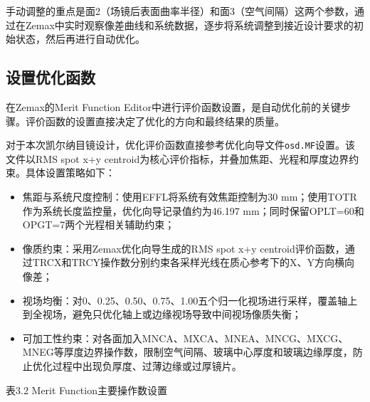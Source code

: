 手动调整的重点是面2（场镜后表面曲率半径）和面3（空气间隔）这两个参数，通过在Zemax中实时观察像差曲线和系统数据，逐步将系统调整到接近设计要求的初始状态，然后再进行自动优化。

\subsection{设置优化函数}

在Zemax的Merit Function Editor中进行评价函数设置，是自动优化前的关键步骤。评价函数的设置直接决定了优化的方向和最终结果的质量\cite{Fischer2008,Laikin2007,Zemax2021}。

对于本次凯尔纳目镜设计，优化评价函数直接参考优化向导文件\verb|osd.MF|设置。该文件以RMS spot x+y centroid为核心评价指标，并叠加焦距、光程和厚度边界约束。具体设置策略如下：

\begin{itemize}
\item
  焦距与系统尺度控制：使用EFFL将系统有效焦距控制为30 mm；使用TOTR作为系统长度监控量，优化向导记录值约为46.197 mm；同时保留OPLT=60和OPGT=7两个光程相关辅助约束；
\item
  像质约束：采用Zemax优化向导生成的RMS spot x+y centroid评价函数，通过TRCX和TRCY操作数分别约束各采样光线在质心参考下的X、Y方向横向像差；
\item
  视场均衡：对0、0.25、0.50、0.75、1.00五个归一化视场进行采样，覆盖轴上到全视场，避免只优化轴上或边缘视场导致中间视场像质失衡；
\item
  可加工性约束：对各面加入MNCA、MXCA、MNEA、MNCG、MXCG、MNEG等厚度边界操作数，限制空气间隔、玻璃中心厚度和玻璃边缘厚度，防止优化过程中出现负厚度、过薄边缘或过厚镜片。
\end{itemize}

表3.2 Merit Function主要操作数设置

